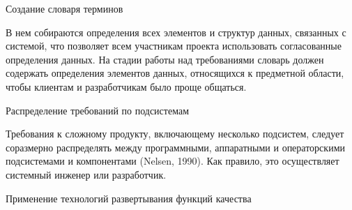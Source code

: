 \documentclass{../industrial-development}
\begin{document}
\lecturenotes

\alert{Создание словаря терминов}

В нем собираются определения всех элементов и структур данных, связанных с системой, что позволяет
всем участникам проекта использовать согласованные определения данных. На стадии работы над требованиями словарь должен содержать определения элементов данных, относящихся к предметной области, чтобы клиентам и разработчикам было проще общаться.

\alert{Распределение требований по подсистемам}

Требования к сложному продукту, включающему несколько подсистем, следует соразмерно распределять между программными, аппаратными и операторскими подсистемами и компонентами (Nelsen, 1990). Как правило, это осуществляет системный инженер или разработчик.

\alert{Применение технологий развертывания функций качества}
\end{document}
